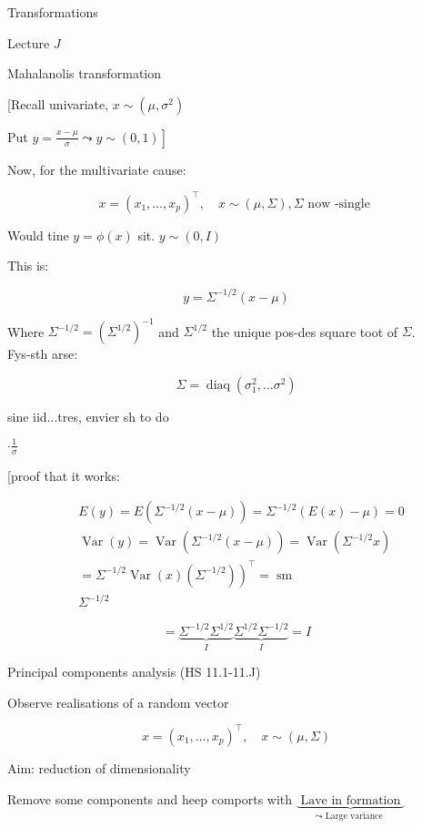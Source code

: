 Transformations

Lecture $J$

Mahalanolis transformation

[Recall univariate, $x \sim\left(\mu, \sigma^{2}\right)$

Put $\left.y=\frac{x-\mu}{\sigma} \leadsto y \sim(0,1)\right]$

Now, for the multivariate cause:

$$
x=\left(x_{1}, \ldots, x_{p}\right)^{\top}, \quad x \sim(\mu, \Sigma), \Sigma \text { now -single }
$$

Would tine $y=\phi(x)$ sit. $y \sim(0, I)$

This is:

$$
y=\Sigma^{-1 / 2}(x-\mu)
$$

Where $\Sigma^{-1 / 2}=\left(\Sigma^{1 / 2}\right)^{-1}$ and $\Sigma^{1 / 2}$ the unique pos-des square toot of $\Sigma$.\\
Fys-sth arse:

$$
\Sigma=\operatorname{diaq}\left(\sigma_{1}^{2}, \ldots \sigma^{2}\right)
$$

sine iid...tres, envier sh to do

$\cdot \frac{1}{\sigma}$

[proof that it works:

$$
\begin{aligned}
& E(y)=E\left(\Sigma^{-1 / 2}(x-\mu)\right)=\Sigma^{-1 / 2}(E(x)-\mu)=0 \\
& \operatorname{Var}(y)=\operatorname{Var}\left(\Sigma^{-1 / 2}(x-\mu)\right)=\operatorname{Var}\left(\Sigma^{-1 / 2} x\right) \\
&\left.=\Sigma^{-1 / 2} \operatorname{Var}(x)\left(\Sigma^{-1 / 2}\right)\right)^{\top}=\operatorname{sm} \\
& \Sigma^{-1 / 2}
\end{aligned}
$$

$$
=\underbrace{\Sigma^{-1 / 2} \Sigma^{1 / 2}}_{I} \underbrace{\Sigma^{1 / 2} \Sigma^{-1 / 2}}_{I}=I
$$

Principal components analysis (HS 11.1-11.J)

Observe realisations of a random vector

$$
x=\left(x_{1}, \ldots, x_{p}\right)^{\top}, \quad x \sim(\mu, \Sigma)
$$

Aim: reduction of dimensionality

Remove some components and heep comports with $\underbrace{\text { Lave in formation }}_{\leadsto \text { Large variance }}$

